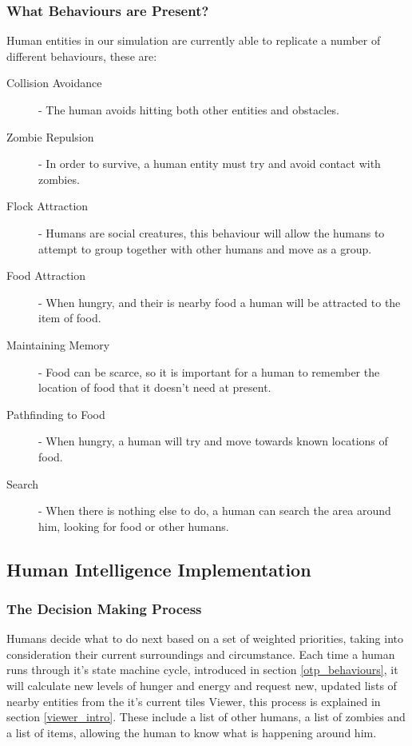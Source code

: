 \subsubsection{What Behaviours are Present?}
Human entities in our simulation are currently able to replicate a number of different behaviours, these are:
\begin{description}
  \item[Collision Avoidance] - The human avoids hitting both other entities and obstacles.
  \item[Zombie Repulsion] - In order to survive, a human entity must try and avoid contact with zombies.
  \item[Flock Attraction] - Humans are social creatures, this behaviour will allow the humans to attempt to group together with other humans and move as a group.
  \item[Food Attraction] - When hungry, and their is nearby food a human will be attracted to the item of food.
  \item[Maintaining Memory] - Food can be scarce, so it is important for a human to remember the location of food that it doesn't need at present.
  \item[Pathfinding to Food] - When hungry, a human will try and move towards known locations of food.
  \item[Search] - When there is nothing else to do, a human can search the area around him, looking for food or other humans.
\end{description}

\subsection{Human Intelligence Implementation}
\subsubsection{The Decision Making Process}
Humans decide what to do next based on a set of weighted priorities, taking into consideration their current surroundings and circumstance. Each time a human runs through it's state machine cycle, introduced in section \ref{otp_behaviours}, it will calculate new levels of hunger and energy and request new, updated lists of nearby entities from the it's current tiles Viewer, this process is explained in section \ref{viewer_intro}. These include a list of other humans, a list of zombies and a list of items, allowing the human to know what is happening around him.

